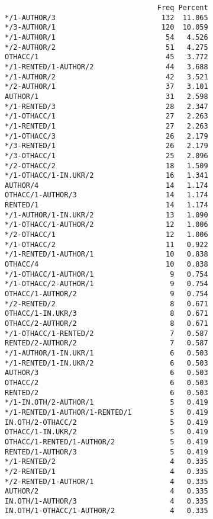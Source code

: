 \documentclass[
  letterpaper,
  DIV=11,
  numbers=noendperiod]{scrreprt}
\begin{document}
\begin{verbatim}
                                    Freq Percent
*/1-AUTHOR/3                         132  11.065
*/3-AUTHOR/1                         120  10.059
*/1-AUTHOR/1                          54   4.526
*/2-AUTHOR/2                          51   4.275
OTHACC/1                              45   3.772
*/1-RENTED/1-AUTHOR/2                 44   3.688
*/1-AUTHOR/2                          42   3.521
*/2-AUTHOR/1                          37   3.101
AUTHOR/1                              31   2.598
*/1-RENTED/3                          28   2.347
*/1-OTHACC/1                          27   2.263
*/1-RENTED/1                          27   2.263
*/1-OTHACC/3                          26   2.179
*/3-RENTED/1                          26   2.179
*/3-OTHACC/1                          25   2.096
*/2-OTHACC/2                          18   1.509
*/1-OTHACC/1-IN.UKR/2                 16   1.341
AUTHOR/4                              14   1.174
OTHACC/1-AUTHOR/3                     14   1.174
RENTED/1                              14   1.174
*/1-AUTHOR/1-IN.UKR/2                 13   1.090
*/1-OTHACC/1-AUTHOR/2                 12   1.006
*/2-OTHACC/1                          12   1.006
*/1-OTHACC/2                          11   0.922
*/1-RENTED/1-AUTHOR/1                 10   0.838
OTHACC/4                              10   0.838
*/1-OTHACC/1-AUTHOR/1                  9   0.754
*/1-OTHACC/2-AUTHOR/1                  9   0.754
OTHACC/1-AUTHOR/2                      9   0.754
*/2-RENTED/2                           8   0.671
OTHACC/1-IN.UKR/3                      8   0.671
OTHACC/2-AUTHOR/2                      8   0.671
*/1-OTHACC/1-RENTED/2                  7   0.587
RENTED/2-AUTHOR/2                      7   0.587
*/1-AUTHOR/1-IN.UKR/1                  6   0.503
*/1-RENTED/1-IN.UKR/2                  6   0.503
AUTHOR/3                               6   0.503
OTHACC/2                               6   0.503
RENTED/2                               6   0.503
*/1-IN.OTH/2-AUTHOR/1                  5   0.419
*/1-RENTED/1-AUTHOR/1-RENTED/1         5   0.419
IN.OTH/2-OTHACC/2                      5   0.419
OTHACC/1-IN.UKR/2                      5   0.419
OTHACC/1-RENTED/1-AUTHOR/2             5   0.419
RENTED/1-AUTHOR/3                      5   0.419
*/1-RENTED/2                           4   0.335
*/2-RENTED/1                           4   0.335
*/2-RENTED/1-AUTHOR/1                  4   0.335
AUTHOR/2                               4   0.335
IN.OTH/1-AUTHOR/3                      4   0.335
IN.OTH/1-OTHACC/1-AUTHOR/2             4   0.335

\end{verbatim}
\end{document}
